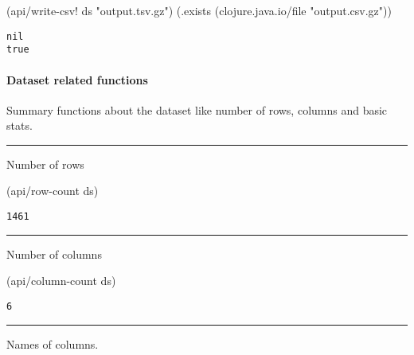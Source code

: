 \documentclass[]{article}
\newenvironment{Shaded}{\begin{snugshade}}{\end{snugshade}}
\newcommand{\StringTok}[1]{\textcolor[rgb]{0.31,0.60,0.02}{#1}}
\newcommand{\NormalTok}[1]{#1}
\let\oldparagraph\paragraph
\renewcommand{\paragraph}[1]{\oldparagraph{#1}\mbox{}}
\begin{document}
\begin{Shaded}
\begin{Highlighting}[]
\NormalTok{(api/write-csv! ds }\StringTok{"output.tsv.gz"}\NormalTok{)}
\NormalTok{(.exists (clojure.java.io/file }\StringTok{"output.csv.gz"}\NormalTok{))}
\end{Highlighting}
\end{Shaded}

\begin{verbatim}
nil
true
\end{verbatim}

\paragraph{Dataset related functions}\label{dataset-related-functions}

Summary functions about the dataset like number of rows, columns and
basic stats.

\begin{center}\rule{0.5\linewidth}{0.5pt}\end{center}

Number of rows

\begin{Shaded}
\begin{Highlighting}[]
\NormalTok{(api/row-count ds)}
\end{Highlighting}
\end{Shaded}

\begin{verbatim}
1461
\end{verbatim}

\begin{center}\rule{0.5\linewidth}{0.5pt}\end{center}

Number of columns

\begin{Shaded}
\begin{Highlighting}[]
\NormalTok{(api/column-count ds)}
\end{Highlighting}
\end{Shaded}

\begin{verbatim}
6
\end{verbatim}

\begin{center}\rule{0.5\linewidth}{0.5pt}\end{center}

Names of columns.
\end{document}
